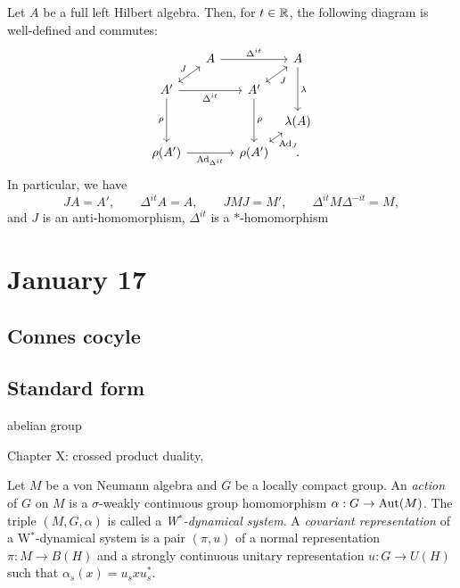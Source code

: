 \documentclass{../../small}
\begin{document}
\begin{cor}
Let $A$ be a full left Hilbert algebra.
Then, for $t\in\mathbb{R}$, the following diagram is well-defined and commutes:
\[\begin{tikzcd}[column sep={3.5em,between origins},row sep={2.5em,between origins}]
&A\ar{rr}{\Delta^{it}}&&A\ar{dd}{\lambda}\\
A'\ar[<->]{ur}{J}\ar[swap]{rr}{\Delta^{it}}\ar[swap]{dd}{\rho}&&A'\ar[<->,swap]{ur}{J}\ar{dd}{\rho}&\\
&&&\lambda(A)\\
\rho(A')\ar[swap]{rr}{\Ad_{\Delta^{it}}}&&\rho(A')\ar[<->,swap]{ur}{\Ad_J}&.
\end{tikzcd}\]
In particular, we have
\[JA=A',\qquad\Delta^{it}A=A,\qquad JMJ=M',\qquad\Delta^{it}M\Delta^{-it}=M,\]
and $J$ is an anti-homomorphism, $\Delta^{it}$ is a $*$-homomorphism
\end{cor}
\begin{pf}

\end{pf}










\newpage
\section{January 17}


\subsection{Connes cocyle}


\subsection{Standard form}



abelian group

Chapter X: crossed product duality,

Let $M$ be a von Neumann algebra and $G$ be a locally compact group.
An \emph{action} of $G$ on $M$ is a $\sigma$-weakly continuous group homomorphism $\alpha:G\to\operatorname{Aut}(M)$.
The triple $(M,G,\alpha)$ is called a \emph{W$^*$-dynamical system}.
A \emph{covariant representation} of a W$^*$-dynamical system is a pair $(\pi,u)$ of a normal representation $\pi:M\to B(H)$ and a strongly continuous unitary representation $u:G\to U(H)$ such that $\alpha_s(x)=u_sxu_s^*$.
\end{document}
